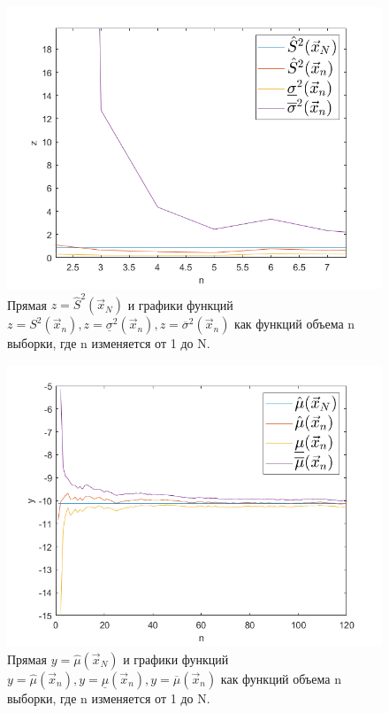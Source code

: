 \documentclass[12pt]{report}
\begin{document}
\begin{figure}[H]
	\centering
	\includegraphics[scale=0.7]{imgs/1.png}
	\caption{Прямая $z=\hat S^2 (\vec x_N)$ и графики функций $z= S^2 (\vec x_n), z= \underline \sigma^2 (\vec x_n), z =\overline \sigma^2 (\vec x_n)$ как функций объема n выборки, где n изменяется от 1 до N.}
	\label{fig:1}
\end{figure}

\begin{figure}[H]
	\centering
	\includegraphics[scale=0.7]{imgs/2.png}
	\caption{Прямая $y=\hat \mu (\vec x_N)$ и графики функций $y=\hat \mu (\vec x_n), y= \underline \mu (\vec x_n), y =\overline \mu (\vec x_n)$ как функций объема n выборки, где n изменяется от 1 до N.}
	\label{fig:2}
\end{figure}
\end{document}
